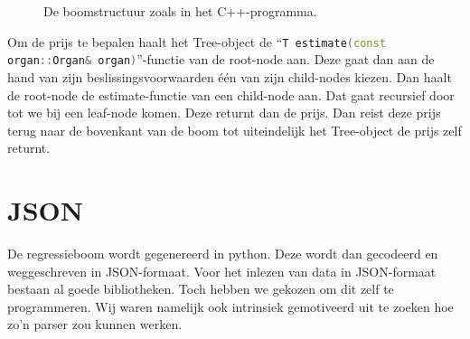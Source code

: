 \begin{figure}[ht]
    \centering
    \small

    \caption{De boomstructuur zoals in het C++-programma.}
    \label{fig:cpp-tree}
\end{figure}

Om de prijs te bepalen haalt het Tree-object de ``\lstinline[language=C++]{T estimate(const organ::Organ& organ)}''-functie van de root-node aan. Deze gaat dan aan de hand van zijn beslissingsvoorwaarden één van zijn child-nodes kiezen. Dan haalt de root-node de estimate-functie van een child-node aan. Dat gaat recursief door tot we bij een leaf-node komen. Deze returnt dan de prijs. Dan reist deze prijs terug naar de bovenkant van de boom tot uiteindelijk het Tree-object de prijs zelf returnt.

\pagebreak
\section{JSON}
De regressieboom wordt gegenereerd in python. Deze wordt dan gecodeerd en weggeschreven in JSON-formaat. Voor het inlezen van data in JSON-formaat bestaan al goede bibliotheken. Toch hebben we gekozen om dit zelf te programmeren. Wij waren namelijk ook intrinsiek gemotiveerd uit te zoeken hoe zo'n parser zou kunnen werken.

